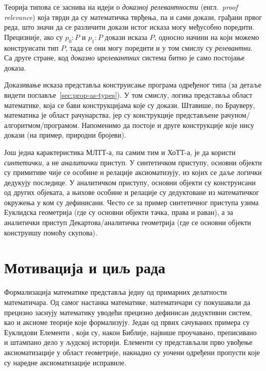 \documentclass[12pt,oneside]{memoir}
\begin{document}
Теорија типова се заснива на идеји о \emph{доказној релевантности} (енгл.~\emph{proof relevance}) која тврди да су математичка тврђења, па и сами докази, грађани првог реда, што значи да се различити докази истог исказа могу међусобно поредити. Прецизније, ако су $p_0 : P$ и $p_1 : P$ докази исказа $P$, односно начини на који можемо конструисати тип $P$, тада се они могу поредити и у том смислу су \emph{релевантни}. Са друге стране, код \emph{доказно ирелевантних} система битно је само постојање доказа. 

Доказивање исказа представља конструисање програма одређеног типа (за детаље видети поглавље~\ref{sec:prop-as-types}). У том смислу, логика представља област математике, која се бави конструкцијама које су докази. Штавише, по Брауверу, математика је област рачунарства, јер су конструкције представљене рачуном/алгоритмом/програмом. Напоменимо да постоје и друге конструкције које нису докази (на пример, природни бројеви).

Још једна карактеристика МЛТТ-а, па самим тим и ХоТТ-а, је да користи \emph{синтетички}, а не \emph{аналитички} приступ. У синтетичком приступу, основни објекти су примитиве чије се особине и релације аксиоматизују, из којих се даље логички дедукују последице. У аналитичком приступу, основни објекти су конструисани од других објеката, а њихове особине и релације су дедуктоване из математичког окружења у ком су дефинисани. Често се за пример синтетичног приступа узима Еуклидска геометрија (где су основни објекти тачка, права и раван), а за аналитички приступ Декартова/аналитичка геометрија (где се основни објекти конструишу помоћу скупова).

\section{Мотивација и циљ рада}

Формализација математике представља једну од примарних делатности математичара. Од самог настанка математике, математичари су покушавали да прецизно заснују математику уводећи прецизно дефинисан дедуктивни систем, као и аксиоме теорије које формализују. Један од првих сачуваних примера су Еуклидови Елементи \cite{ee}, који су, након Библије, највише проучавано, преписивано и штампано дело у људској историји. Елементи су представљали прво увођење аксиоматизације у област геометрије, накнадно су уочени одређени пропусти које су наредне аксиоматизације исправиле.
\end{document}
